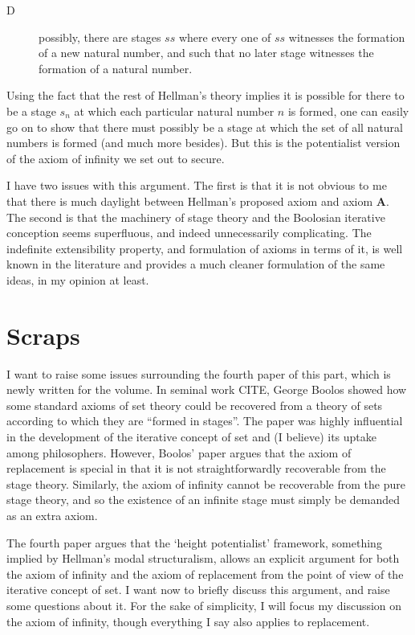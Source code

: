 \documentclass{asl}
\theoremstyle{definition}
\begin{document}
\begin{description}
    \item[D] possibly, there are stages $ss$ 
    where every one of $ss$ witnesses the formation of a new natural number, 
    and such that no later stage witnesses the formation of a natural number.
\end{description}

Using the fact that the rest of Hellman's theory implies 
it is possible for there to be a stage $s_n$ at which 
each particular natural number $n$ is formed, 
one can easily go on to show that there must possibly be a stage 
at which the set of all natural numbers is formed (and much more besides). 
But this is the potentialist version of the axiom of infinity we set out to secure.

I have two issues with this argument. 
The first is that it is not obvious to me 
that there is much daylight between Hellman's proposed axiom 
and axiom {\bf A}. The second is that the machinery of stage theory 
and the Boolosian iterative conception seems superfluous, 
and indeed unnecessarily complicating. The indefinite extensibility property,
and formulation of axioms in terms of it, is well known in the literature 
and provides a much cleaner formulation of the same ideas, in my opinion at least.

\section{Scraps}
I want to raise some issues surrounding 
the fourth paper of this part, 
which is newly written for the volume. 
In seminal work CITE, George Boolos showed 
how some standard axioms of set theory could 
be recovered from a theory of sets according 
to which they are ``formed in stages''. 
The paper was highly influential in the 
development of the iterative concept of 
set and (I believe) its uptake among philosophers. 
However, Boolos' paper argues that the axiom of 
replacement is special in that it is not 
straightforwardly recoverable from the stage theory. 
Similarly, the axiom of infinity cannot be recoverable 
from the pure stage theory, 
and so the existence of an infinite stage must 
simply be demanded as an extra axiom. 

The fourth paper argues that the `height potentialist' 
framework, something implied by Hellman's modal 
structuralism, allows an explicit argument for both 
the axiom of infinity and the axiom of replacement 
from the point of view of the iterative concept of set. 
I want now to briefly discuss this argument, and raise 
some questions about it. For the sake of simplicity, I 
will focus my discussion on the axiom of infinity, though 
everything I say also applies to replacement.
\end{document}
